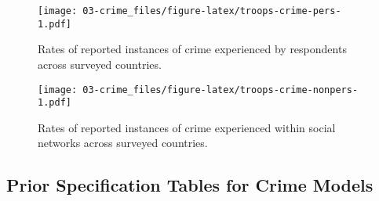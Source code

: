 \documentclass[
]{book}
\theoremstyle{definition}
\theoremstyle{definition}
\theoremstyle{definition}
\theoremstyle{definition}
\theoremstyle{remark}
\begin{document}
\begin{figure}
\centering
\texttt{[image: 03-crime\_files/figure-latex/troops-crime-pers-1.pdf]}
\caption{\label{fig:troops-crime-pers}Rates of reported instances of crime experienced by respondents across surveyed countries.}
\end{figure}

\begin{figure}
\centering
\texttt{[image: 03-crime\_files/figure-latex/troops-crime-nonpers-1.pdf]}
\caption{\label{fig:troops-crime-nonpers}Rates of reported instances of crime experienced within social networks across surveyed countries.}
\end{figure}

\hypertarget{prior-specification-tables-for-crime-models}{%
\subsection{Prior Specification Tables for Crime Models}\label{prior-specification-tables-for-crime-models}}
\end{document}
